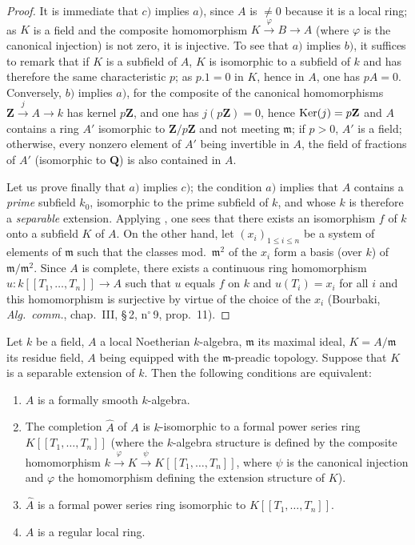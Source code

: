 \begin{proof}
It is immediate that $c)$ implies $a)$, since $A$ is $\neq 0$ because it is a local ring;
as $K$ is a field and the composite homomorphism $K\xrightarrow{\varphi}B\to A$ (where $\varphi$ is the canonical injection) is not zero, it is injective.
To see that $a)$ implies $b)$, it suffices to remark that if $K$ is a subfield of $A$, $K$ is isomorphic to a subfield of $k$ and has therefore the same characteristic $p$;
as $p.1=0$ in $K$, hence in $A$, one has $pA=0$.
Conversely, $b)$ implies $a)$, for the composite of the canonical homomorphisms $\mathbf{Z}\xrightarrow{j}A\to k$ has kernel $p\mathbf{Z}$, and one has $j(p\mathbf{Z})=0$, hence $\operatorname{Ker}(j)=p\mathbf{Z}$ and $A$ contains a ring $A'$ isomorphic to $\mathbf{Z}/p\mathbf{Z}$ and not meeting $\mathfrak{m}$;
if $p>0$, $A'$ is a field; otherwise,
every nonzero element of $A'$ being invertible in $A$, the field of fractions of $A'$ (isomorphic to $\mathbf{Q}$) is also contained in $A$.

Let us prove finally that $a)$ implies $c)$;
the condition $a)$ implies that $A$ contains a \emph{prime} subfield $k_0$, isomorphic to the prime subfield of $k$, and whose $k$ is therefore a \emph{separable} extension.
Applying , one sees that there exists an isomorphism $f$ of $k$ onto a subfield $K$ of $A$.
On the other hand, let $(x_i)_{1\leq i\leq n}$ be a system of elements of $\mathfrak{m}$ such that the classes mod.\ $\mathfrak{m}^2$ of the $x_i$ form a basis (over $k$) of $\mathfrak{m}/\mathfrak{m}^2$.
Since $A$ is complete, there exists a continuous ring homomorphism $u:k[[T_1,\ldots,T_n]]\to A$ such that $u$ equals $f$ on $k$ and $u(T_i)=x_i$ for all $i$ and this homomorphism is surjective by virtue of the choice of the $x_i$ (Bourbaki, \emph{Alg.\ comm.}, chap.~III, \S\,2, n$^\circ$\,9, prop.~11).
\end{proof}

\begin{theorem}[19.6.4]
\label{0.19.6.4}
Let $k$ be a field, $A$ a local Noetherian $k$-algebra, $\mathfrak{m}$ its maximal ideal, $K=A/\mathfrak{m}$ its residue field, $A$ being equipped with the $\mathfrak{m}$-preadic topology.
Suppose that $K$ is a \textup{separable} extension of $k$.
Then the following conditions are equivalent:
\begin{enumerate}
  \item[\textup{a)}] $A$ is a formally smooth $k$-algebra.
  \item[\textup{b)}] The completion $\widehat{A}$ of $A$ is $k$-isomorphic to a formal power series ring $K[[T_1,\ldots,T_n]]$ \textup{(where the $k$-algebra structure is defined by the composite homomorphism $k\xrightarrow{\varphi}K\xrightarrow{\psi}K[[T_1,\ldots,T_n]]$, where $\psi$ is the canonical injection and $\varphi$ the homomorphism defining the extension structure of $K$)}.
  \item[\textup{b')}] $\widehat{A}$ is a formal power series ring isomorphic to $K[[T_1,\ldots,T_n]]$.
  \item[\textup{c)}] $A$ is a regular local ring.
\end{enumerate}
\end{theorem}

